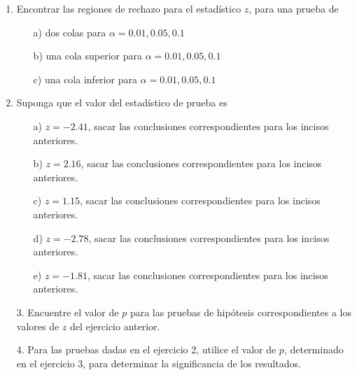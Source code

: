 \begin{frame}
\begin{frame}
\begin{enumerate}
\item Encontrar las regiones de rechazo para el estad\'istico $z$, para una prueba de
\begin{itemize}
\item[a) ]  dos colas para $\alpha=0.01,0.05,0.1$
\item[b) ]  una cola superior para $\alpha=0.01,0.05,0.1$
\item[c) ] una cola inferior para $\alpha=0.01,0.05,0.1$

\end{itemize}


\item Suponga que el valor del estad\'istico de prueba es 
\begin{itemize}
\item[a) ]$z=-2.41$, sacar las conclusiones correspondientes para los incisos anteriores.
\item[b) ] $z=2.16$, sacar las conclusiones correspondientes para los incisos anteriores.
\item[c) ] $z=1.15$, sacar las conclusiones correspondientes para los incisos anteriores.
\item[d) ] $z=-2.78$, sacar las conclusiones correspondientes para los incisos anteriores.
\item[e) ] $z=-1.81$, sacar las conclusiones correspondientes para los incisos anteriores.

\end{itemize}
\end{enumerate}





\begin{itemize}
\item[3. ] Encuentre el valor de $p$ para las pruebas de hip\'otesis correspondientes a los valores de $z$ del ejercicio anterior.

\item[4. ] Para las pruebas dadas en el ejercicio 2, utilice el valor de $p$, determinado en el ejercicio 3,  para determinar la significancia de los resultados.


\end{itemize}







\end{frame}
\end{frame}
